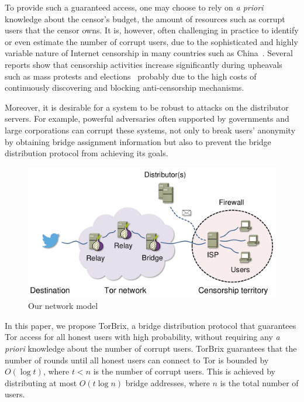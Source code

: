 \documentclass[letterpaper,twocolumn,10pt]{article}
\newcommand{\sfsize}{\fontsize{0.73\baselineskip}{0.73\baselineskip}\selectfont}
\newcommand{\sans}[1]{\textsf{\sfsize \mbox{#1}}}
\newcommand{\brix}{\sans{TorBrix}\xspace}
\begin{document}
To provide such a guaranteed access, one may choose to rely on \emph{a priori} knowledge about the censor's budget, the amount of resources such as corrupt users that the censor owns. It is, however, often challenging in practice to identify or even estimate the number of corrupt users, due to the sophisticated and highly variable nature of Internet censorship in many countries such as China~\cite{Oni:2012:China,Ensafi2015b}. Several reports show that censorship activities increase significantly during upheavals such as mass protests and elections~\cite{Dainotti:2011, washingtonpost:2009} probably due to the high costs of continuously discovering and blocking anti-censorship mechanisms.

Moreover, it is desirable for a system to be robust to attacks on the distributor servers. For example, powerful adversaries often supported by governments and large corporations can corrupt these systems, not only to break users' anonymity by obtaining bridge assignment information but also to prevent the bridge distribution protocol from achieving its goals.%

\begin{figure}
	\centering
	\includegraphics[width=0.95\linewidth]{images/model.pdf}
	\caption{Our network model}
	\label{fig:model}
\end{figure}

In this paper, we propose \brix, a bridge distribution protocol that guarantees Tor access for all honest users with high probability, without requiring any \emph{a priori} knowledge about the number of corrupt users. \brix guarantees that the number of rounds until all honest users can connect to Tor is bounded by $O(\log{t})$, where ${t<n}$ is the number of corrupt users. This is achieved by distributing at most $O(t\log{n})$ bridge addresses, where $n$ is the total number of users.
\end{document}

